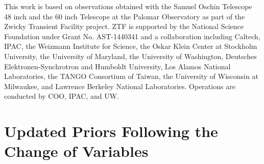 \documentclass[twocolumn]{./aastex63}
\begin{document}
This work is based on observations obtained with the Samuel Oschin Telescope
48 inch and the 60 inch Telescope at the Palomar Observatory as part of the
Zwicky Transient Facility project. ZTF is supported by the National Science
Foundation under Grant No. AST-1440341 and a collaboration including Caltech,
IPAC, the Weizmann Institute for Science, the Oskar Klein Center at Stockholm
University, the University of Maryland, the University of Washington,
Deutsches Elektronen-Synchrotron and Humboldt University, Los Alamos National
Laboratories, the TANGO Consortium of Taiwan, the University of Wisconsin at
Milwaukee, and Lawrence Berkeley National Laboratories. Operations are
conducted by COO, IPAC, and UW.



\appendix

\section{Updated Priors Following the Change of Variables}\label{sec:prior}
\end{document}
